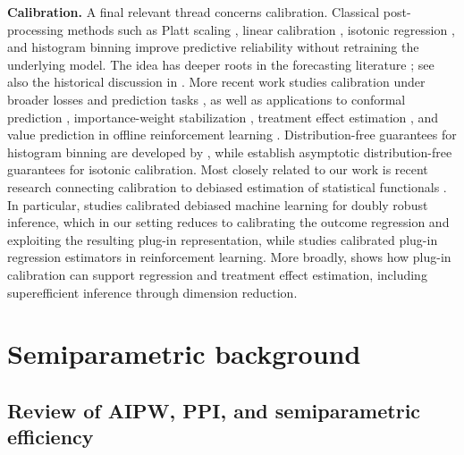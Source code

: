 \documentclass{article}
\theoremstyle{plain}
\theoremstyle{definition}
\newcommand{\1}{\mathbf{1}}
\begin{document}
\textbf{Calibration.} A final relevant thread concerns calibration. Classical post-processing methods such as Platt scaling \citep{platt1999probabilistic,cox1958two,gupta2023online}, linear calibration \citep{mincer1969evaluation,chernozhukov2018generic,leng2021calibration}, isotonic regression \citep{zadrozny2002transforming,niculescu2005predicting}, and histogram binning \citep{zadrozny2001obtaining,gupta2021distribution} improve predictive reliability without retraining the underlying model. The idea has deeper roots in the forecasting literature \citep{mincer1969evaluation,lichtenstein1977calibration,vovk1992universal,vovk2005algorithmic,gneiting2007probabilistic,lambert2011elicitation}; see also the historical discussion in \citet{lee2023t}. More recent work studies calibration under broader losses and prediction tasks \citep{jung2021moment,noarov2023statistical,van2023causal,whitehouse2024orthogonal,van2025venn}, as well as applications to conformal prediction \citep{van2024self,van2025venn}, importance-weight stabilization \citep{gutman2022propensity,deshpande2023calibrated,ballinari2024improving,van2024stabilized}, treatment effect estimation \citep{chernozhukov2018generic,van2023causal,whitehouse2024orthogonal}, and value prediction in offline reinforcement learning \citep{van2025bellman}. Distribution-free guarantees for histogram binning are developed by \citet{gupta2021distribution}, while \citet{van2023causal,van2025venn} establish asymptotic distribution-free guarantees for isotonic calibration. Most closely related to our work is recent research connecting calibration to debiased estimation of statistical functionals \citep{van2024automatic,van2023adaptive,van2025semiparametric}. In particular, \citet{van2024automatic} studies calibrated debiased machine learning for doubly robust inference, which in our setting reduces to calibrating the outcome regression and exploiting the resulting plug-in representation, while \citet{van2025semiparametric} studies calibrated plug-in regression estimators in reinforcement learning. More broadly, \citet{van2023adaptive} shows how plug-in calibration can support regression and treatment effect estimation, including superefficient inference through dimension reduction.

\section{Semiparametric background}
\label{app:semicolon}

\subsection{Review of AIPW, PPI, and semiparametric efficiency}
\label{sec:effreview}
\end{document}
